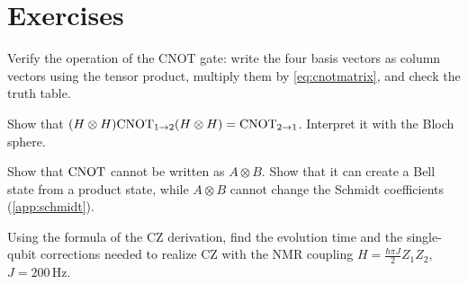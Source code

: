 \section{Exercises}
\begin{exercise}
Verify the operation of the CNOT gate: write the four basis vectors as column vectors using the tensor product, multiply them by \cref{eq:cnotmatrix}, and check the truth table.
\end{exercise}
\begin{exercise}
Show that $(H\otimes H)\mathrm{CNOT}_{1\to2}(H\otimes H)=\mathrm{CNOT}_{2\to1}$. Interpret it with the Bloch sphere.
\end{exercise}
\begin{exercise}
Show that $\mathrm{CNOT}$ cannot be written as $A\otimes B$. Show that it can create a Bell state from a product state, while $A\otimes B$ cannot change the Schmidt coefficients (\cref{app:schmidt}).
\end{exercise}
\begin{exercise}
Using the formula of the CZ derivation, find the evolution time and the single-qubit corrections needed to realize CZ with the NMR coupling $H=\frac{\hbar\pi J}{2}Z_1Z_2$, $J=200$\,Hz.
\end{exercise}
